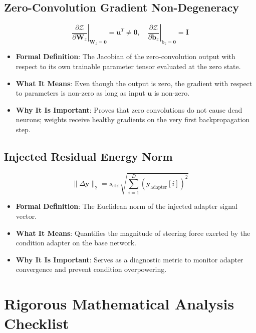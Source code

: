 \documentclass[11pt,a4paper]{article}
\theoremstyle{definition}
\begin{document}
\subsection{Zero-Convolution Gradient Non-Degeneracy}
{\boldmath
\begin{equation}
\left. \frac{\partial \mathcal{Z}}{\partial \mathbf{W}_z} \right|_{\mathbf{W}_z = \mathbf{0}} = \mathbf{u}^T \ne \mathbf{0}, \quad \left. \frac{\partial \mathcal{Z}}{\partial \mathbf{b}_z} \right|_{\mathbf{b}_z = \mathbf{0}} = \mathbf{I}
\end{equation}
}
\begin{itemize}
    \item \textbf{Formal Definition}: The Jacobian of the zero-convolution output with respect to its own trainable parameter tensor evaluated at the zero state.
    \item \textbf{What It Means}: Even though the output is zero, the gradient with respect to parameters is non-zero as long as input $\mathbf{u}$ is non-zero.
    \item \textbf{Why It Is Important}: Proves that zero convolutions do not cause dead neurons; weights receive healthy gradients on the very first backpropagation step.
\end{itemize}

\subsection{Injected Residual Energy Norm}
{\boldmath
\begin{equation}
\|\Delta \mathbf{y}\|_2 = s_{\text{ctrl}} \sqrt{\sum_{i=1}^D (\mathbf{y}_{\text{adapter}}[i])^2}
\end{equation}
}
\begin{itemize}
    \item \textbf{Formal Definition}: The Euclidean norm of the injected adapter signal vector.
    \item \textbf{What It Means}: Quantifies the magnitude of steering force exerted by the condition adapter on the base network.
    \item \textbf{Why It Is Important}: Serves as a diagnostic metric to monitor adapter convergence and prevent condition overpowering.
\end{itemize}

\section{Rigorous Mathematical Analysis Checklist}
\end{document}
